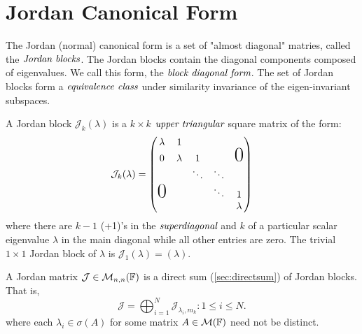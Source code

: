 
\section{Jordan Canonical Form} %
\label{sec:JordanForm}

The Jordan (normal) canonical form is a set of "almost diagonal"
matries, called the $\emph{Jordan blocks}$. The Jordan blocks
contain the diagonal components composed of eigenvalues. We call
this form, the $\emph{block diagonal form}$. The set of Jordan
blocks form a $\emph{equivalence class}$ under similarity invariance
of the eigen-invariant subspaces.

\begin{defn}
	A Jordan block $\mathcal{J}_k(\lambda)$ is a $k \times k$
	$\emph{upper triangular}$ square matrix of the form:
	\[
		\mathcal{J}_k(\lambda) =
		\begin{pmatrix}
			\lambda & 1 & & & \\
			0 & \lambda & 1 & & \text{\huge{0}} \\
			& & \ddots & \ddots & \\
			\text{\huge{0}} & & & \ddots & 1 \\
			& & & & \lambda
		\end{pmatrix}
	\]
	where there are $k-1$ (+1)'s in the $\emph{superdiagonal}$ and
	$k$ of a particular scalar eigenvalue $\lambda$ in the main
	diagonal while all other entries are zero. The trivial $1 \times 1$
	Jordan block of $\lambda$ is $\mathcal{J}_1(\lambda) = ( \lambda )$.
\end{defn}

\begin{defn}
	A Jordan matrix $\mathcal{J} \in \mathcal{M}_{n,n}(\mathbb{F})$ is a
	direct sum (\ref{sec:directsum}) of Jordan blocks. That is,
	\[
		\mathcal{J} =
		\bigoplus_{i=1}^{N} \mathcal{J}_{\lambda_i , m_k} : 1 \leq i \leq N.
	\]
	where each $\lambda_i \in \sigma(A)$ for some matrix $A \in \mathcal{M}(\mathbb{F})$
	need not be distinct.
\end{defn}

